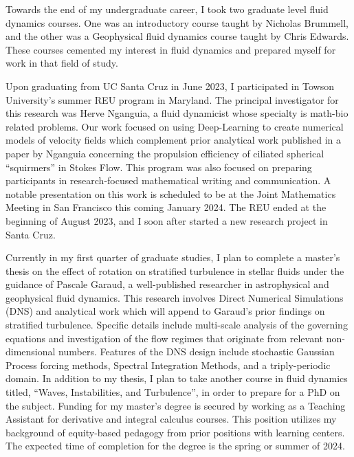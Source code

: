 \documentclass{article}
\begin{document}
Towards the end of my undergraduate career, I took two graduate level fluid dynamics courses. One was an introductory course taught by Nicholas Brummell, and the other was a Geophysical fluid dynamics course taught by Chris Edwards. These courses cemented my interest in fluid dynamics and prepared myself for work in that field of study. 

Upon graduating from UC Santa Cruz in June 2023, I participated in Towson University's summer REU program in Maryland. The principal investigator for this research was Herve Nganguia, a fluid dynamicist whose specialty is math-bio related problems. Our work focused on using Deep-Learning to create numerical models of velocity fields which complement prior analytical work published in a paper by Nganguia concerning the propulsion efficiency of ciliated spherical ``squirmers'' in Stokes Flow. This program was also focused on preparing participants in research-focused mathematical writing and communication. A notable presentation on this work is scheduled to be at the Joint Mathematics Meeting in San Francisco this coming January 2024. The REU ended at the beginning of August 2023, and I soon after started a new research project in Santa Cruz. 

Currently in my first quarter of graduate studies, I plan to complete a master's thesis on the effect of rotation on stratified turbulence in stellar fluids under the guidance of Pascale Garaud, a well-published researcher in astrophysical and geophysical fluid dynamics. This research involves Direct Numerical Simulations (DNS) and analytical work which will append to Garaud's prior findings on stratified turbulence. Specific details include multi-scale analysis of the governing equations and investigation of the flow regimes that originate from relevant non-dimensional numbers. Features of the DNS design include stochastic Gaussian Process forcing methods, Spectral Integration Methods, and a triply-periodic domain. In addition to my thesis, I plan to take another course in fluid dynamics titled, ``Waves, Instabilities, and Turbulence'', in order to prepare for a PhD on the subject. Funding for my master's degree is secured by working as a Teaching Assistant for derivative and integral calculus courses. This position utilizes my background of equity-based pedagogy from prior positions with learning centers. The expected time of completion for the degree is the spring or summer of 2024. 
\end{document}
